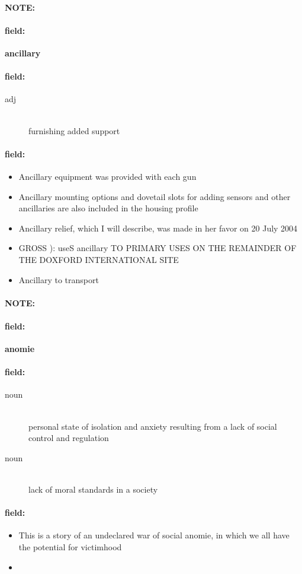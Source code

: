 \documentclass[12pt]{article}
\newenvironment{note}{\paragraph{NOTE:}}{}
\newenvironment{field}{\paragraph{field:}}{}
\begin{document}
\begin{note}
\begin{field}
\textbf{\large ancillary}
\end{field}


\begin{field}
\begin{description}
\item[adj] \hfill \\ 
furnishing added support

\end{description}
\end{field}

\begin{field}
\begin{itemize}
\item Ancillary equipment was provided with each gun
\item Ancillary mounting options and dovetail slots for adding sensors and other ancillaries are also included in the housing profile
\item Ancillary relief, which I will describe, was made in her favor on 20 July 2004
\item GROSS ): useS ancillary TO PRIMARY USES ON THE REMAINDER OF THE DOXFORD INTERNATIONAL SITE
\item Ancillary to transport
\end{itemize}
\end{field}
\end{note}
\begin{note}
\begin{field}
\textbf{\large anomie}
\end{field}


\begin{field}
\begin{description}
\item[noun] \hfill \\ 
personal state of isolation and anxiety resulting from a lack of social control and regulation

\item[noun] \hfill \\ 
lack of moral standards in a society

\end{description}
\end{field}

\begin{field}
\begin{itemize}
\item This is a story of an undeclared war of social anomie, in which we all have the potential for victimhood
\item 
\end{itemize}
\end{field}
\end{note}
\end{document}
